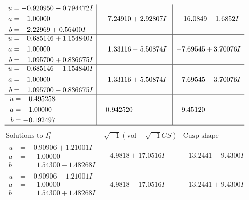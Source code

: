 \documentclass[1p]{elsarticle_modified}
\theoremstyle{definition}
\newcommand{\I}{\sqrt{-1}}
\begin{document}
$$\begin{array}{c|c|c}
\begin{aligned}
u &= -0.920950 - 0.794472 I \\
a &= \phantom{-}1.00000\phantom{ +0.000000I} \\
b &= \phantom{-}2.22969 + 0.56400 I\end{aligned}
 & -7.24910 + 2.92807 I & -16.0849 - 1.6852 I \\ \hline\begin{aligned}
u &= \phantom{-}0.685146 + 1.154840 I \\
a &= \phantom{-}1.00000\phantom{ +0.000000I} \\
b &= \phantom{-}1.095700 + 0.836675 I\end{aligned}
 & \phantom{-}1.33116 - 5.50874 I & -7.69545 + 3.70076 I \\ \hline\begin{aligned}
u &= \phantom{-}0.685146 - 1.154840 I \\
a &= \phantom{-}1.00000\phantom{ +0.000000I} \\
b &= \phantom{-}1.095700 - 0.836675 I\end{aligned}
 & \phantom{-}1.33116 + 5.50874 I & -7.69545 - 3.70076 I \\ \hline\begin{aligned}
u &= \phantom{-}0.495258\phantom{ +0.000000I} \\
a &= \phantom{-}1.00000\phantom{ +0.000000I} \\
b &= -0.192497\phantom{ +0.000000I}\end{aligned}
 & -0.942520\phantom{ +0.000000I} & -9.45120\phantom{ +0.000000I}\\
 \hline 
 \end{array}$$\newpage$$\begin{array}{c|c|c}  
\text{Solutions to }I^u_{1}& \I (\text{vol} + \sqrt{-1}CS) & \text{Cusp shape}\\
 \hline 
\begin{aligned}
u &= -0.90906 + 1.21001 I \\
a &= \phantom{-}1.00000\phantom{ +0.000000I} \\
b &= \phantom{-}1.54300 - 1.48268 I\end{aligned}
 & -4.9818 + 17.0516 I & -13.2441 - 9.4300 I \\ \hline\begin{aligned}
u &= -0.90906 - 1.21001 I \\
a &= \phantom{-}1.00000\phantom{ +0.000000I} \\
b &= \phantom{-}1.54300 + 1.48268 I\end{aligned}
 & -4.9818 - 17.0516 I & -13.2441 + 9.4300 I \\ \hline\begin{aligned}

\end{aligned}
\end{array}$$
\end{document}
